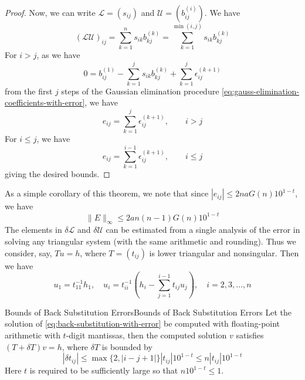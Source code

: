\documentclass[../main.tex]{subfiles}
\begin{document}
\begin{proof}
	Now, we can write $\mathcal{L} = (s_{ij})$ and $\mathcal{U} = (b_{ij}^{(i)})$. We have
	\begin{equation*}
		(\mathcal{L} \mathcal{U})_{ij} = \sum_{k=1}^n s_{ik} b_{kj}^{(k)} = \sum_{k=1}^{\min(i,j)} s_{ik} b_{kj}^{(k)}
	\end{equation*}
	For $i > j$, as we have
	\begin{equation*}
		0 = b_{ij}^{(1)} - \sum_{k=1}^j s_{ik} b_{kj}^{(k)} + \sum_{k=1}^j \epsilon_{ij}^{(k+1)}
	\end{equation*}
	from the first $j$ steps of the Gaussian elimination procedure \eqref{eq:gauss-elimination-coefficients-with-error}, we have
	\begin{equation*}
		e_{ij} = \sum_{k=1}^j \epsilon_{ij}^{(k+1)}, \qquad i > j
	\end{equation*}
	For $i \leq j$, we have
	\begin{equation*}
		e_{ij} = \sum_{k=1}^{i-1} \epsilon_{ij}^{(k+1)}, \qquad i \leq j
	\end{equation*}
	giving the desired bounds.
\end{proof}

As a simple corollary of this theorem, we note that since $|e_{ij}| \leq 2 n a G(n) 10^{1-t}$, we have
\begin{equation*}
	\| E \|_{\infty} \leq 2 a n (n-1) G(n) 10^{1-t}
\end{equation*}
The elements in $\delta \mathcal{L}$ and $\delta \mathcal{U}$ can be estimated from a single analysis of the error in solving any triangular system (with the same arithmetic and rounding). Thus we consider, say, $T u = h$, where $T = (t_{ij})$ is lower triangular and nonsingular. Then we have
\begin{equation} \label{eq:back-substitution-with-error}
	u_1 = t_{11}^{-1} h_1, \quad u_i = t_{ii}^{-1} \left( h_i - \sum_{j=1}^{i-1} t_{ij} u_j \right), \quad i = 2, 3, \ldots, n
\end{equation}

\begin{proposition}{Bounds of Back Substitution Errors}{Bounds of Back Substitution Errors}
	Let the solution of \eqref{eq:back-substitution-with-error} be computed with floating-point arithmetic with $t$-digit mantissas, then the computed solution $v$ satisfies $(T + \delta T) v = h$, where $\delta T$ is bounded by
	\begin{equation*}
		| \delta t_{ij} | \leq \max \{ 2, |i - j + 1| \} | t_{ij} | 10^{1-t} \leq n | t_{ij} | 10^{1-t}
	\end{equation*}
	Here $t$ is required to be sufficiently large so that $n 10^{1-t} \leq 1$.
\end{proposition}
\end{document}
